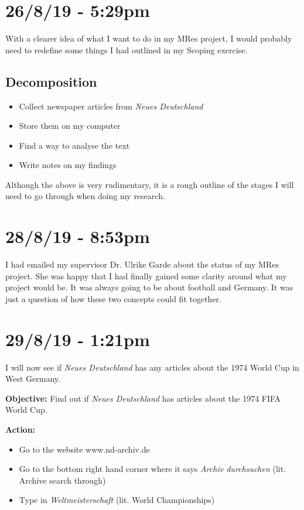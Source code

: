 \documentclass{article}
\begin{document}
\section*{26/8/19 - 5:29pm}

With a clearer idea of what I want to do in my MRes project, I would probably need to redefine some things I had outlined in my Scoping exercise.

\subsection*{Decomposition}

\begin{itemize}
    \item Collect newspaper articles from \textit{Neues Deutschland}
    \item Store them on my computer
    \item Find a way to analyse the text
    \item Write notes on my findings
\end{itemize}

Although the above is very rudimentary, it is a rough outline of the stages I will need to go through when doing my research.

\section*{28/8/19 - 8:53pm}

I had emailed my supervisor Dr. Ulrike Garde about the status of my MRes project. She was happy that I had finally gained some clarity around what my project would be. It was always going to be about football and Germany. It was just a question of how these two concepts could fit together.

\section*{29/8/19 - 1:21pm}

I will now see if \textit{Neues Deutschland} has any articles about the 1974 World Cup in West Germany.

\textbf{Objective:} Find out if \textit{Neues Deutschland} has articles about the 1974 FIFA World Cup.

\textbf{Action:}
\begin{itemize}
    \item Go to the website www.nd-archiv.de
    \item Go to the bottom right hand corner where it says \textit{Archiv durchsuchen} (lit. Archive search through)
    \item Type in \textit{Weltmeisterschaft} (lit. World Championships)
\end{itemize}
\end{document}
